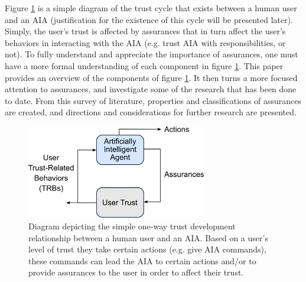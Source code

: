     Figure \ref{fig:SimpleTrust_one_way} is a simple diagram of the trust cycle that exists between a human user and an AIA (justification for the existence of this cycle will be presented later). Simply, the user's trust is affected by assurances that in turn affect the user's behaviors in interacting with the AIA (e.g. trust AIA with responsibilities, or not). To fully understand and appreciate the importance of assurances, one must have a more formal understanding of each component in figure \ref{fig:SimpleTrust_one_way}. %
    This paper provides an overview of the components of figure \ref{fig:SimpleTrust_one_way}. It then turns a more focused attention to assurances, and investigate some of the research that has been done to date. From this survey of literature, properties and classifications of assurances are created, and directions and considerations for further research are presented.

    \begin{figure}
        \centering
        \includegraphics[width=0.7\textwidth]{Figures/SimpleTrust_one_way.png}
        \caption{Diagram depicting the simple one-way trust development relationship between a human user and an AIA. Based on a user's level of trust they take certain actions (e.g. give AIA commands), these commands can lead the AIA to certain actions and/or to provide assurances to the user in order to affect their trust.}
        \label{fig:SimpleTrust_one_way}
    \end{figure}

